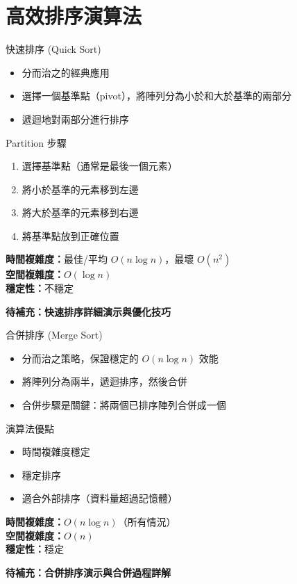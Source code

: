 \documentclass{beamer}
\begin{document}
\section{高效排序演算法}

\begin{frame}{快速排序 (Quick Sort)}
\begin{itemize}
    \item 分而治之的經典應用
    \item 選擇一個基準點（pivot），將陣列分為小於和大於基準的兩部分
    \item 遞迴地對兩部分進行排序
\end{itemize}

\vspace{1em}
\begin{block}{Partition 步驟}
\begin{enumerate}
    \item 選擇基準點（通常是最後一個元素）
    \item 將小於基準的元素移到左邊
    \item 將大於基準的元素移到右邊
    \item 將基準點放到正確位置
\end{enumerate}
\end{block}

\vspace{1em}
\textbf{時間複雜度：}最佳/平均 $O(n \log n)$，最壞 $O(n^2)$\\
\textbf{空間複雜度：}$O(\log n)$\\
\textbf{穩定性：}不穩定

\vspace{1em}
\textbf{待補充：快速排序詳細演示與優化技巧}
\end{frame}

\begin{frame}{合併排序 (Merge Sort)}
\begin{itemize}
    \item 分而治之策略，保證穩定的 $O(n \log n)$ 效能
    \item 將陣列分為兩半，遞迴排序，然後合併
    \item 合併步驟是關鍵：將兩個已排序陣列合併成一個
\end{itemize}

\vspace{1em}
\begin{block}{演算法優點}
\begin{itemize}
    \item 時間複雜度穩定
    \item 穩定排序
    \item 適合外部排序（資料量超過記憶體）
\end{itemize}
\end{block}

\vspace{1em}
\textbf{時間複雜度：}$O(n \log n)$（所有情況）\\
\textbf{空間複雜度：}$O(n)$\\
\textbf{穩定性：}穩定

\vspace{1em}
\textbf{待補充：合併排序演示與合併過程詳解}
\end{frame}
\end{document}
